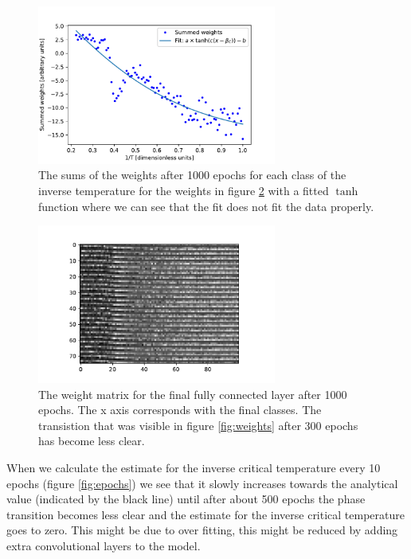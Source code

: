 \documentclass[10 pt, a4paper]{article}
\begin{document}
\begin{figure}[H] 
\centering
\includegraphics[width=0.7\textwidth]{fitwrong}
\caption{The sums of the weights after 1000 epochs for each class of the inverse temperature for the weights in figure \ref{fig:weightswrong} with a fitted $\tanh$ function where we can see that the fit does not fit the data properly. \label{fig:fitwrong}}
\end{figure}

\begin{figure}[H] 
\centering
\includegraphics[width=0.7\textwidth]{weightswrong}
\caption{The weight matrix for the final fully connected layer after 1000 epochs. The x axis corresponds with the final classes. The transistion that was visible in figure \ref{fig:weights} after 300 epochs has become less clear.  \label{fig:weightswrong}}
\end{figure}

When we calculate the estimate for the inverse critical temperature every 10 epochs (figure \ref{fig:epochs}) we see that it slowly increases towards the analytical value (indicated by the black line) until after about 500 epochs the phase transition becomes less clear and the estimate for the inverse critical temperature goes to zero. This might be due to over fitting, this might be reduced by adding extra convolutional layers to the model.
\end{document}

